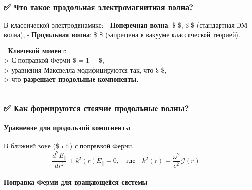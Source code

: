 \documentclass[11pt]{article}
\begin{document}
\subsubsection{✅ Что такое продольная электромагнитная
волна?}\label{ux447ux442ux43e-ux442ux430ux43aux43eux435-ux43fux440ux43eux434ux43eux43bux44cux43dux430ux44f-ux44dux43bux435ux43aux442ux440ux43eux43cux430ux433ux43dux438ux442ux43dux430ux44f-ux432ux43eux43bux43dux430-1}

В классической электродинамике: - \textbf{Поперечная волна}: \$ 
\perp {} \$, \$  \perp {} \$ (стандартная ЭМ волна), -
\textbf{Продольная волна}: \$  \parallel {} \$ (запрещена в
вакууме классической теорией).

📌 \textbf{Ключевой момент}:\\
\textgreater{} С поправкой Ферми \$  = 1 +
 \$,\\
\textgreater{} уравнения Максвелла модифицируются так, что \$
\nabla \cdot {}  \$,\\
\textgreater{} что \textbf{разрешает продольные компоненты}.

\begin{center}\rule{0.5\linewidth}{\linethickness}\end{center}

\subsubsection{✅ Как формируются стоячие продольные
волны?}\label{ux43aux430ux43a-ux444ux43eux440ux43cux438ux440ux443ux44eux442ux441ux44f-ux441ux442ux43eux44fux447ux438ux435-ux43fux440ux43eux434ux43eux43bux44cux43dux44bux435-ux432ux43eux43bux43dux44b}

\paragraph{Уравнение для продольной
компоненты}\label{ux443ux440ux430ux432ux43dux435ux43dux438ux435-ux434ux43bux44f-ux43fux440ux43eux434ux43eux43bux44cux43dux43eux439-ux43aux43eux43cux43fux43eux43dux435ux43dux442ux44b}

В ближней зоне (\$ r \ll \lambda \$) с поправкой Ферми: \[
\frac{d^2 E_{\parallel}}{dr^2} + k^2(r) E_{\parallel} = 0, \quad \text{где} \quad k^2(r) = \frac{\omega^2}{c^2} \mathcal{G}(r)
\]

\paragraph{Поправка Ферми для вращающейся
системы}\label{ux43fux43eux43fux440ux430ux432ux43aux430-ux444ux435ux440ux43cux438-ux434ux43bux44f-ux432ux440ux430ux449ux430ux44eux449ux435ux439ux441ux44f-ux441ux438ux441ux442ux435ux43cux44b-1}
\end{document}
